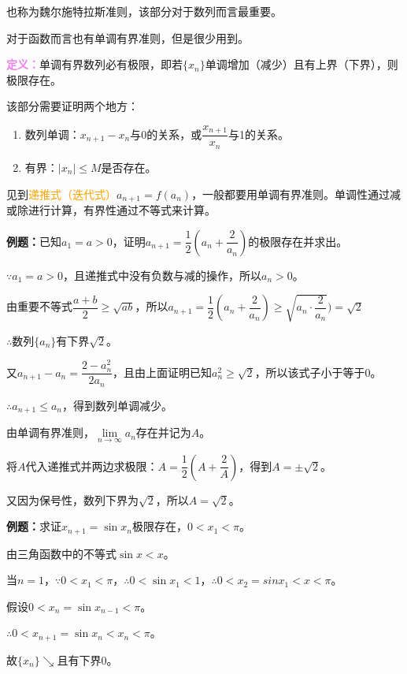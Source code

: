 \documentclass[UTF8, 12pt]{ctexart}
\begin{document}
也称为魏尔施特拉斯准则，该部分对于数列而言最重要。

对于函数而言也有单调有界准则，但是很少用到。

\textcolor{violet}{\textbf{定义：}}单调有界数列必有极限，即若$\{x_n\}$单调增加（减少）且有上界（下界），则极限存在。

该部分需要证明两个地方：

\begin{enumerate}
    \item 数列单调：$x_{n+1}-x_n$与0的关系，或$\dfrac{x_{n+1}}{x_n}$与1的关系。
    \item 有界：$\vert x_n\vert\leqslant M$是否存在。
\end{enumerate}

见到\textcolor{orange}{递推式（迭代式）}$a_{n+1}=f(a_n)$，一般都要用单调有界准则。单调性通过减或除进行计算，有界性通过不等式来计算。

\textbf{例题：}已知$a_1=a>0$，证明$a_{n+1}=\dfrac{1}{2}\left(a_n+\dfrac{2}{a_n}\right)$的极限存在并求出。

$\because a_1=a>0$，且递推式中没有负数与减的操作，所以$a_n>0$。

由重要不等式$\dfrac{a+b}{2}\geqslant\sqrt{ab}$，所以$a_{n+1}=\dfrac{1}{2}\left(a_n+\dfrac{2}{a_n}\right)\geqslant\sqrt{a_n\cdot\dfrac{2}{a_n}})=\sqrt{2}$

$\therefore$数列$\{a_n\}$有下界$\sqrt{2}$。

又$a_{n+1}-a_n=\dfrac{2-a_n^2}{2a_n}$，且由上面证明已知$a_n^2\geqslant\sqrt{2}$，所以该式子小于等于0。

$\therefore a_{n+1}\leqslant a_n$，得到数列单调减少。

由单调有界准则，$\lim\limits_{n\to\infty}a_n$存在并记为$A$。

将$A$代入递推式并两边求极限：$A=\dfrac{1}{2}(A+\dfrac{2}{A})$，得到$A=\pm\sqrt{2}$。

又因为保号性，数列下界为$\sqrt{2}$，所以$A=\sqrt{2}$。

\textbf{例题：}求证$x_{n+1}=\sin x_n$极限存在，$0<x_1<\pi$。

由三角函数中的不等式$\sin x<x$。

当$n=1$，$\because 0<x_1<\pi$，$\therefore 0<\sin x_1<1$，$\therefore 0<x_2=sin x_1<x<\pi$。

假设$0<x_n=\sin x_{n-1}<\pi$。

$\therefore 0<x_{n+1}=\sin x_n<x_n<\pi$。

故$\{x_n\}\searrow$且有下界0。
\end{document}
